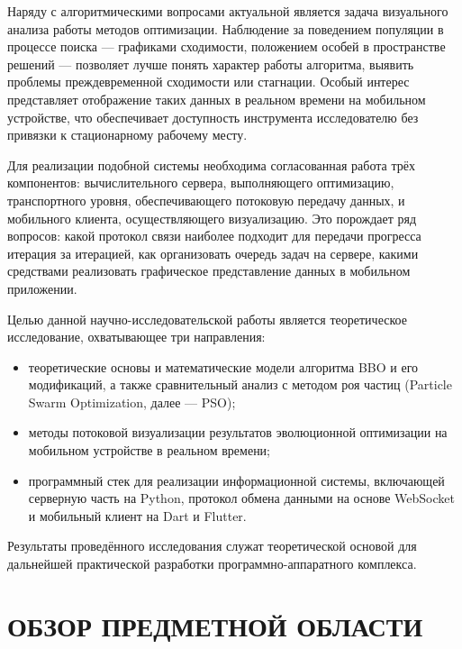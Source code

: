 \documentclass[14pt, russian]{scrartcl}
\begin{document}
Наряду с алгоритмическими вопросами актуальной является задача визуального анализа работы методов оптимизации. Наблюдение за поведением популяции в процессе поиска --- графиками сходимости, положением особей в пространстве решений --- позволяет лучше понять характер работы алгоритма, выявить проблемы преждевременной сходимости или стагнации. Особый интерес представляет отображение таких данных в реальном времени на мобильном устройстве, что обеспечивает доступность инструмента исследователю без привязки к стационарному рабочему месту.

Для реализации подобной системы необходима согласованная работа трёх компонентов: вычислительного сервера, выполняющего оптимизацию, транспортного уровня, обеспечивающего потоковую передачу данных, и мобильного клиента, осуществляющего визуализацию. Это порождает ряд вопросов: какой протокол связи наиболее подходит для передачи прогресса итерация за итерацией, как организовать очередь задач на сервере, какими средствами реализовать графическое представление данных в мобильном приложении.

Целью данной научно-исследовательской работы является теоретическое исследование, охватывающее три направления:
\begin{itemize}
    \item теоретические основы и математические модели алгоритма BBO и его модификаций, а также сравнительный анализ с методом роя частиц (Particle Swarm Optimization, далее --- PSO);
    \item методы потоковой визуализации результатов эволюционной оптимизации на мобильном устройстве в реальном времени;
    \item программный стек для реализации информационной системы, включающей серверную часть на Python, протокол обмена данными на основе WebSocket и мобильный клиент на Dart и Flutter.
\end{itemize}

Результаты проведённого исследования служат теоретической основой для дальнейшей практической разработки программно-аппаратного комплекса.

\section{ОБЗОР ПРЕДМЕТНОЙ ОБЛАСТИ}
\end{document}
